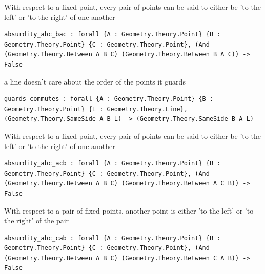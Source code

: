\begin{theorem}
  \label{Geometry.Theory.Betweenness.absurdity_abc_bac}
  \leanok
  With respect to a fixed point, every pair of points can be said to either be 'to the left' or 'to the right' of one another 
\begin{verbatim}absurdity_abc_bac : forall {A : Geometry.Theory.Point} {B : Geometry.Theory.Point} {C : Geometry.Theory.Point}, (And (Geometry.Theory.Between A B C) (Geometry.Theory.Between B A C)) -> False\end{verbatim}
\end{theorem}

\begin{theorem}
  \label{Geometry.Theory.Betweenness.guards_commutes}
  \leanok
  a line doesn't care about the order of the points it guards 
\begin{verbatim}guards_commutes : forall {A : Geometry.Theory.Point} {B : Geometry.Theory.Point} {L : Geometry.Theory.Line}, (Geometry.Theory.SameSide A B L) -> (Geometry.Theory.SameSide B A L)\end{verbatim}
\end{theorem}

\begin{theorem}
  \label{Geometry.Theory.Betweenness.absurdity_abc_acb}
  \leanok
  With respect to a fixed point, every pair of points can be said to either be 'to the left' or 'to the right' of one another 
\begin{verbatim}absurdity_abc_acb : forall {A : Geometry.Theory.Point} {B : Geometry.Theory.Point} {C : Geometry.Theory.Point}, (And (Geometry.Theory.Between A B C) (Geometry.Theory.Between A C B)) -> False\end{verbatim}
\end{theorem}

\begin{theorem}
  \label{Geometry.Theory.Betweenness.absurdity_abc_cab}
  \leanok
  With respect to a pair of fixed points, another point is either 'to the left' or 'to the right' of the pair 
\begin{verbatim}absurdity_abc_cab : forall {A : Geometry.Theory.Point} {B : Geometry.Theory.Point} {C : Geometry.Theory.Point}, (And (Geometry.Theory.Between A B C) (Geometry.Theory.Between C A B)) -> False\end{verbatim}
\end{theorem}

